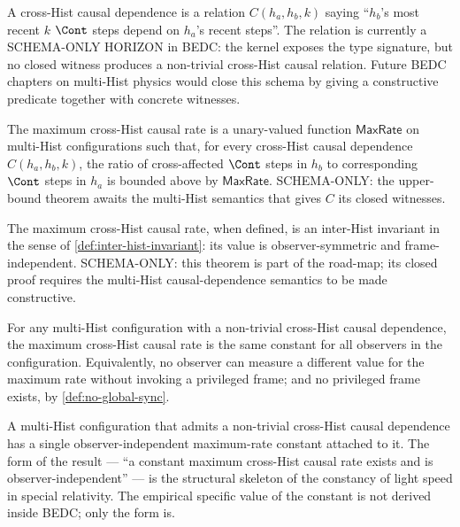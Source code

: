 \begin{definition}
\label{def:cross-hist-causal-schema}
A cross-Hist causal dependence is a relation \(C(h_a, h_b, k)\) saying ``\(h_b\)'s most recent \(k\) \(\Cont\) steps depend on \(h_a\)'s recent steps''. The relation is currently a SCHEMA-ONLY HORIZON in BEDC: the kernel exposes the type signature, but no closed witness produces a non-trivial cross-Hist causal relation. Future BEDC chapters on multi-Hist physics would close this schema by giving a constructive predicate together with concrete witnesses.
\end{definition}
\begin{definition}
\label{def:max-causal-rate-schema}
The maximum cross-Hist causal rate is a unary-valued function \(\mathsf{MaxRate}\) on multi-Hist configurations such that, for every cross-Hist causal dependence \(C(h_a, h_b, k)\), the ratio of cross-affected \(\Cont\) steps in \(h_b\) to corresponding \(\Cont\) steps in \(h_a\) is bounded above by \(\mathsf{MaxRate}\). SCHEMA-ONLY: the upper-bound theorem awaits the multi-Hist semantics that gives \(C\) its closed witnesses.
\end{definition}
\begin{theorem}
\label{thm:max-rate-invariant-schema}
The maximum cross-Hist causal rate, when defined, is an inter-Hist invariant in the sense of \autoref{def:inter-hist-invariant}: its value is observer-symmetric and frame-independent. SCHEMA-ONLY: this theorem is part of the road-map; its closed proof requires the multi-Hist causal-dependence semantics to be made constructive.
\end{theorem}
\begin{theorem}
\label{thm:max-rate-constant-schema}
For any multi-Hist configuration with a non-trivial cross-Hist causal dependence, the maximum cross-Hist causal rate is the same constant for all observers in the configuration. Equivalently, no observer can measure a different value for the maximum rate without invoking a privileged frame; and no privileged frame exists, by \autoref{def:no-global-sync}.
\end{theorem}
\begin{corollary}
\label{cor:light-speed-constant-schema}
A multi-Hist configuration that admits a non-trivial cross-Hist causal dependence has a single observer-independent maximum-rate constant attached to it. The form of the result --- ``a constant maximum cross-Hist causal rate exists and is observer-independent'' --- is the structural skeleton of the constancy of light speed in special relativity. The empirical specific value of the constant is not derived inside BEDC; only the form is.
\end{corollary}
